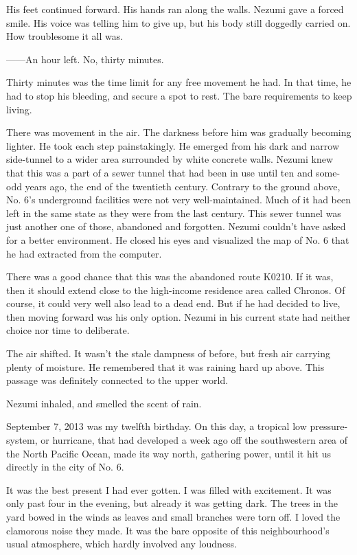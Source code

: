 His feet continued forward. His hands ran along the walls. Nezumi gave a
forced smile. His voice was telling him to give up, but his body still
doggedly carried on. How troublesome it all was.

------An hour left. No, thirty minutes.

Thirty minutes was the time limit for any free movement he had. In that
time, he had to stop his bleeding, and secure a spot to rest. The bare
requirements to keep living.

There was movement in the air. The darkness before him was gradually
becoming lighter. He took each step painstakingly. He emerged from his
dark and narrow side-tunnel to a wider area surrounded by white concrete
walls. Nezumi knew that this was a part of a sewer tunnel that had been
in use until ten and some-odd years ago, the end of the twentieth
century. Contrary to the ground above, No. 6's underground facilities
were not very well-maintained. Much of it had been left in the same
state as they were from the last century. This sewer tunnel was just
another one of those, abandoned and forgotten. Nezumi couldn't have
asked for a better environment. He closed his eyes and visualized the
map of No. 6 that he had extracted from the computer.

There was a good chance that this was the abandoned route K0210. If it
was, then it should extend close to the high-income residence area
called Chronos. Of course, it could very well also lead to a dead end.
But if he had decided to live, then moving forward was his only option.
Nezumi in his current state had neither choice nor time to deliberate.

The air shifted. It wasn't the stale dampness of before, but fresh air
carrying plenty of moisture. He remembered that it was raining hard up
above. This passage was definitely connected to the upper world.

Nezumi inhaled, and smelled the scent of rain.

\mybreak

September 7, 2013 was my twelfth birthday. On this day, a tropical low
pressure-system, or hurricane, that had developed a week ago off the
southwestern area of the North Pacific Ocean, made its way north,
gathering power, until it hit us directly in the city of No. 6.

It was the best present I had ever gotten. I was filled with excitement.
It was only past four in the evening, but already it was getting dark.
The trees in the yard bowed in the winds as leaves and small branches
were torn off. I loved the clamorous noise they made. It was the bare
opposite of this neighbourhood's usual atmosphere, which hardly involved
any loudness.

